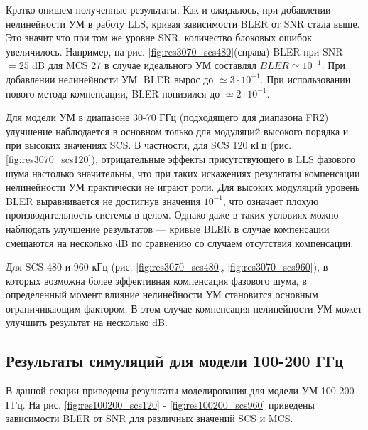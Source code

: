 Кратко опишем полученные результаты. Как и ожидалось, при добавлении
нелинейности УМ в работу LLS, кривая зависимости BLER от SNR стала выше.
Это значит что при том же уровне SNR, количество блоковых ошибок
увеличилось. Например, на рис. \ref{fig:res3070_scs480}(справа)
BLER при SNR$=25$ dB для MCS 27 в случае идеального УМ составлял
$BLER\simeq 10^{-1}$. При добавлении нелинейности УМ, BLER вырос до
$\simeq 3\cdot10^{-1}$. При использовании нового метода компенсации, BLER
понизился до $\simeq 2\cdot10^{-1}$.

Для модели УМ в диапазоне 30-70 ГГц (подходящего для диапазона FR2)
улучшение наблюдается в основном только для модуляций высокого порядка и
при высоких значениях SCS. В частности, для SCS 120 кГц (рис.
\ref{fig:res3070_scs120}), отрицательные эффекты присутствующего в LLS
фазового шума настолько значительны, что при таких искажениях результаты
компенсации нелинейности УМ практически не играют роли. Для высоких
модуляций уровень BLER выравнивается не достигнув значения $10^{-1}$, что
означает плохую производительность системы в целом. Однако даже в таких
условиях можно наблюдать улучшение результатов — кривые BLER в случае
компенсации смещаются на несколько dB по сравнению со случаем отсутствия
компенсации.

Для SCS 480 и 960 кГц (рис. \ref{fig:res3070_scs480},
\ref{fig:res3070_scs960}), в которых возможна более эффективная компенсация
фазового шума, в определенный момент влияние нелинейности УМ становится
основным ограничивающим фактором. В этом случае компенсация нелинейности УМ
может улучшить результат на несколько dB.

\subsection{Результаты симуляций для модели 100-200 ГГц}
В данной секции приведены результаты моделирования для модели УМ 100-200 ГГц. 
На рис. \ref{fig:res100200_scs120} - \ref{fig:res100200_scs960} приведены
зависимости BLER от SNR для различных значений SCS и MCS.


